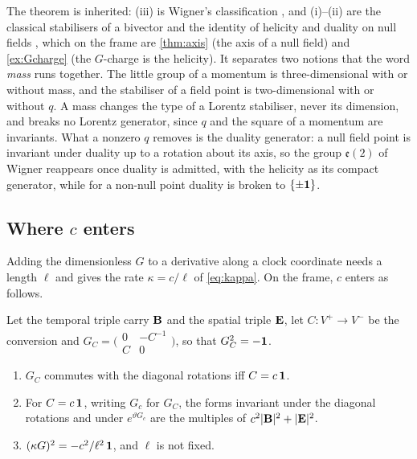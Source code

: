 The theorem is inherited: (iii) is Wigner's classification \cite{Wigner39,WeinbergQFT}, and (i)--(ii) are the classical stabilisers of a
bivector and the identity of helicity and duality on null fields \cite{PenroseRindler84,Calkin65}, which on the frame are \cref{thm:axis} (the
axis of a null field) and \cref{ex:Gcharge} (the $G$-charge is the helicity). It separates two notions that the word \emph{mass} runs together.
The little group of a momentum is three-dimensional with or without mass, and the stabiliser of a field point is two-dimensional with or without
$q$. A mass changes the type of a Lorentz stabiliser, never its dimension, and breaks no Lorentz generator, since $q$ and the square of a momentum
are invariants. What a nonzero $q$ removes is the duality generator: a null field point is invariant under duality up to a rotation about its
axis, so the group $\mathfrak e(2)$ of Wigner reappears once duality is admitted, with the helicity as its compact generator, while for a non-null
point duality is broken to $\{\pm\mathbf 1\}$.

\subsection{\texorpdfstring{Where $c$ enters}{Where c enters}}
\label{sec:energy-c}

Adding the dimensionless $G$ to a derivative along a clock coordinate needs a length $\ell$ and gives the rate $\kappa=c/\ell$ of
\eqref{eq:kappa}. On the frame, $c$ enters as follows.

\begin{proposition}
\label{en:onec}
Let the temporal triple carry $\mathbf B$ and the spatial triple $\mathbf E$, let $C:V^+\to V^-$ be the conversion and
$G_C=\bigl(\begin{smallmatrix}0&-C^{-1}\\ C&0\end{smallmatrix}\bigr)$, so that $G_C^2=-\mathbf 1$.
\begin{enumerate}[label=(\roman*),leftmargin=2.2em]
\item $G_C$ commutes with the diagonal rotations iff $C=c\,\mathbf 1$.
\item For $C=c\,\mathbf 1$, writing $G_c$ for $G_C$, the forms invariant under the diagonal rotations and under $e^{\vartheta G_c}$ are the multiples of $c^2|\mathbf B|^2+|\mathbf E|^2$.
\item $(\kappa G)^2=-c^2/\ell^2\,\mathbf 1$, and $\ell$ is not fixed.
\end{enumerate}
\end{proposition}

